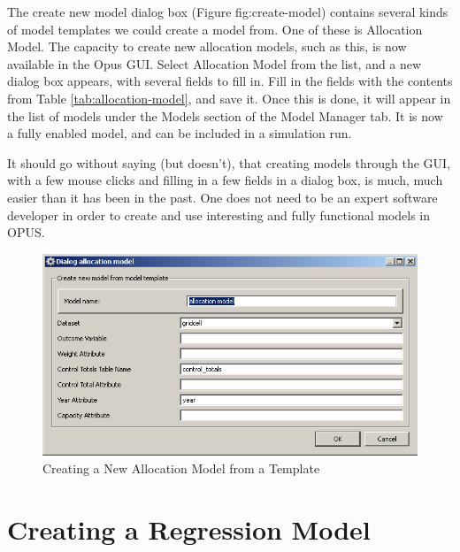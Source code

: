 The create new model dialog box (Figure {fig:create-model}) contains several kinds of model templates we could create a model from. One of these is Allocation Model. The capacity to create new allocation models, such as this, is now available in the Opus GUI. Select Allocation Model from the list, and a new dialog box appears, with several fields to fill in.  Fill in the fields with the contents from Table \ref{tab:allocation-model}, and save it.  Once this is done, it will appear in the list of models under the Models section of the Model Manager tab.  It is now a fully enabled model, and can be included in a simulation run.

It should go without saying (but doesn't), that creating models through the GUI, with a few mouse clicks and filling in a few fields in a dialog box, is much, much easier than it has been in the past. One does not need to be an expert software developer in order to create and use interesting and fully functional models in OPUS.


\begin{figure}[htp]
\begin{center}
\includegraphics[scale=0.6]{part-gui/images/model-manager-create-allocation-model-from-template.png}
\end{center}
\caption{Creating a New Allocation Model from a Template}
\label{fig:create-allocation-model}
\end{figure}

\section{Creating a Regression Model}

